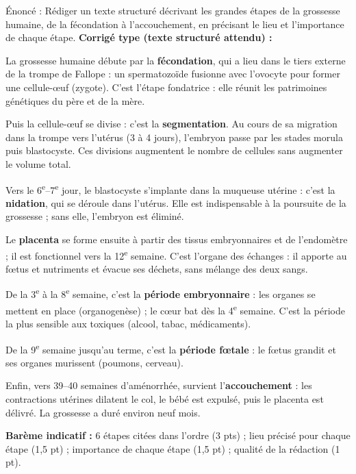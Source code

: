 \documentclass[11pt]{article}
\begin{document}
\begin{corrige}
Énoncé : Rédiger un texte structuré décrivant les grandes étapes de la grossesse humaine, de la fécondation à l'accouchement, en précisant le lieu et l'importance de chaque étape.
\tcblower
\textbf{Corrigé type (texte structuré attendu) :}

La grossesse humaine débute par la \textbf{fécondation}, qui a lieu dans le tiers externe de la trompe de Fallope : un spermatozoïde fusionne avec l'ovocyte pour former une cellule-œuf (zygote). C'est l'étape fondatrice : elle réunit les patrimoines génétiques du père et de la mère.

Puis la cellule-œuf se divise : c'est la \textbf{segmentation}. Au cours de sa migration dans la trompe vers l'utérus (3 à 4 jours), l'embryon passe par les stades morula puis blastocyste. Ces divisions augmentent le nombre de cellules sans augmenter le volume total.

Vers le 6\textsuperscript{e}--7\textsuperscript{e} jour, le blastocyste s'implante dans la muqueuse utérine : c'est la \textbf{nidation}, qui se déroule dans l'utérus. Elle est indispensable à la poursuite de la grossesse ; sans elle, l'embryon est éliminé.

Le \textbf{placenta} se forme ensuite à partir des tissus embryonnaires et de l'endomètre ; il est fonctionnel vers la 12\textsuperscript{e} semaine. C'est l'organe des échanges : il apporte au fœtus  et nutriments et évacue ses déchets, sans mélange des deux sangs.

De la 3\textsuperscript{e} à la 8\textsuperscript{e} semaine, c'est la \textbf{période embryonnaire} : les organes se mettent en place (organogenèse) ; le cœur bat dès la 4\textsuperscript{e} semaine. C'est la période la plus sensible aux toxiques (alcool, tabac, médicaments).

De la 9\textsuperscript{e} semaine jusqu'au terme, c'est la \textbf{période fœtale} : le fœtus grandit et ses organes murissent (poumons, cerveau).

Enfin, vers 39--40 semaines d'aménorrhée, survient l'\textbf{accouchement} : les contractions utérines dilatent le col, le bébé est expulsé, puis le placenta est délivré. La grossesse a duré environ neuf mois.

\textbf{Barème indicatif :} 6 étapes citées dans l'ordre (3 pts) ; lieu précisé pour chaque étape (1,5 pt) ; importance de chaque étape (1,5 pt) ; qualité de la rédaction (1 pt).
\end{corrige}
\end{document}
